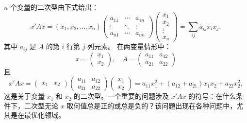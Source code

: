 \begin{translation}
$n$ 个变量的二次型由下式给出：
\[
x'Ax = (x_1, x_2, \ldots, x_n)
\begin{pmatrix}
a_{11} & \cdots & a_{1n} \\
\vdots & \ddots & \vdots \\
a_{n1} & \cdots & a_{nn}
\end{pmatrix}
\begin{pmatrix}
x_1 \\ x_2 \\ \vdots \\ x_n
\end{pmatrix}
= \sum_{ij} a_{ij} x_i x_j,
\]
其中 $a_{ij}$ 是 $A$ 的第 $i$ 行第 $j$ 列元素。
在两变量情形中：
\[
x = \begin{pmatrix} x_1 \\ x_2 \end{pmatrix}, \quad
A = \begin{pmatrix} a_{11} & a_{12} \\ a_{21} & a_{22} \end{pmatrix}
\]
且
\[
x'Ax = \begin{pmatrix} x_1 & x_2 \end{pmatrix}
\begin{pmatrix} a_{11} & a_{12} \\ a_{21} & a_{22} \end{pmatrix}
\begin{pmatrix} x_1 \\ x_2 \end{pmatrix}
= a_{11}x_1^2 + (a_{12}+a_{21})x_1x_2 + a_{22}x_2^2,
\]
这是关于变量 $x_1$ 和 $x_2$ 的二次型。一个重要的问题涉及 $x'Ax$ 的符号：在什么条件下，二次型无论 $x$ 取何值总是正的或总是负的？该问题出现在各种问题中，尤其是在最优化领域。
\end{translation}

